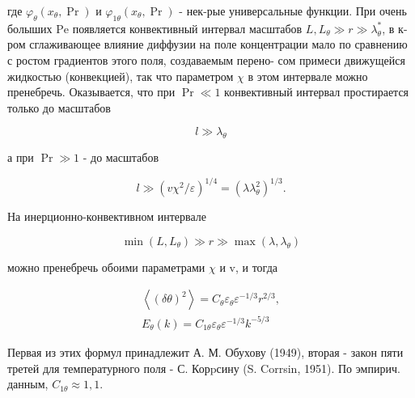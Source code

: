 \documentclass[10pt]{article}
\begin{document}
где $\varphi_{\theta}\left(x_{\theta}, \operatorname{Pr}\right)$ и $\varphi_{1 \theta}\left(x_{\theta}, \operatorname{Pr}\right)$ - нек-рые универсальные функции. При очень болыших $\mathrm{Pe}$ появляется конвективный интервал масштабов $L, L_{\theta} \gg r \gg \lambda_{\theta}^{*}$, в к-ром сглаживающее влияние диффузии на поле концентрации мало по сравнению с ростом градиентов этого поля, создаваемым перено- сом примеси движущейся жидкостью (конвекцией), так что параметром $\chi$ в этом интервале можно пренебречь. Оказывается, что при $\operatorname{Pr} \ll 1$ конвективный интервал простирается только до масштабов



\[

l \gg \lambda_{\theta}

\]



а при $\operatorname{Pr} \gg 1$ - до масштабов



\[

l \gg\left(v \chi^{2} / \varepsilon\right)^{1 / 4}=\left(\lambda \lambda_{\theta}^{2}\right)^{1 / 3} .

\]



На инерционно-конвективном интервале



\[

\min \left(L, L_{\theta}\right) \gg r \gg \max \left(\lambda, \lambda_{\theta}\right)

\]



можно пренебречь обоими параметрами $\chi$ и v, и тогда



\[

\begin{gathered}

\left\langle(\delta \theta)^{2}\right\rangle=C_{\theta} \varepsilon_{\theta} \varepsilon^{-1 / 3} r^{2 / 3}, \\

E_{\theta}(k)=C_{1 \theta} \varepsilon_{\theta} \varepsilon^{-1 / 3} k^{-5 / 3}

\end{gathered}

\]



Первая из этих формул принадлежит А. М. Обухову (1949), вторая - закон пяти третей для температурного поля - С. Корpсину (S. Corrsin, 1951). По эмпирич. данным, $C_{1 \theta} \approx 1,1$.
\end{document}
